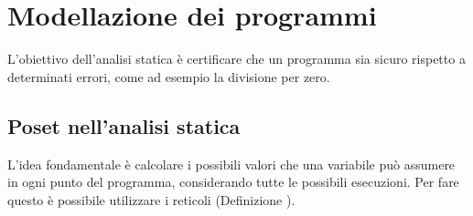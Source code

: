 \section{Modellazione dei programmi}
L'obiettivo dell'analisi statica è certificare che un programma sia sicuro
rispetto a determinati errori, come ad esempio la divisione per zero.

\subsection{Poset nell'analisi statica}

L'idea fondamentale è calcolare i possibili valori che una variabile può
assumere in ogni punto del programma, considerando tutte le possibili
esecuzioni.
Per fare questo è possibile utilizzare i reticoli (Definizione
).

